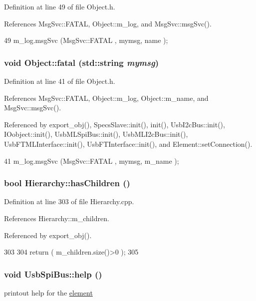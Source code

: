 Definition at line 49 of file Object.h.

References MsgSvc::FATAL, Object::m\_\-log, and MsgSvc::msgSvc().


\begin{DoxyCode}
49 { m_log.msgSvc (MsgSvc::FATAL   , mymsg, name ); }
\end{DoxyCode}
\hypertarget{classObject_aad5a16aac7516ce65bd5ec02ab07fc80}{
\subsubsection[{fatal}]{\setlength{\rightskip}{0pt plus 5cm}void Object::fatal (std::string {\em mymsg})}}
\label{classObject_aad5a16aac7516ce65bd5ec02ab07fc80}


Definition at line 41 of file Object.h.

References MsgSvc::FATAL, Object::m\_\-log, Object::m\_\-name, and MsgSvc::msgSvc().

Referenced by export\_\-obj(), SpecsSlave::init(), init(), UsbI2cBus::init(), IOobject::init(), UsbMLSpiBus::init(), UsbMLI2cBus::init(), UsbFTMLInterface::init(), UsbFTInterface::init(), and Element::setConnection().


\begin{DoxyCode}
41 { m_log.msgSvc (MsgSvc::FATAL   , mymsg, m_name ); }
\end{DoxyCode}
\hypertarget{classHierarchy_a255174fe4d316d2a3f430dcb9dab29f1}{
\subsubsection[{hasChildren}]{\setlength{\rightskip}{0pt plus 5cm}bool Hierarchy::hasChildren ()}}
\label{classHierarchy_a255174fe4d316d2a3f430dcb9dab29f1}


Definition at line 303 of file Hierarchy.cpp.

References Hierarchy::m\_\-children.

Referenced by export\_\-obj().


\begin{DoxyCode}
303                               {
304   return ( m_children.size()>0 );
305 }
\end{DoxyCode}
\hypertarget{classUsbSpiBus_a3543b3bbad0c137fde32fdc554a09a5d}{
\subsubsection[{help}]{\setlength{\rightskip}{0pt plus 5cm}void UsbSpiBus::help ()}}
\label{classUsbSpiBus_a3543b3bbad0c137fde32fdc554a09a5d}
printout help for the \hyperlink{namespaceelement}{element} 

